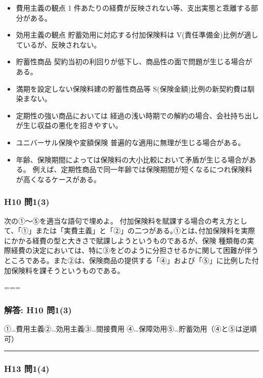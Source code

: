 \documentclass[
]{article}
\providecommand{\tightlist}{%
  \setlength{\itemsep}{0pt}\setlength{\parskip}{0pt}}
\begin{document}
\begin{itemize}
\tightlist
\item
  費用主義の観点 1
  件あたりの経費が反映されない等、支出実態と乖離する部分がある。
\item
  効用主義の観点 貯蓄効用に対応する付加保険料は
  V(責任準備金)比例が適しているが、反映されない。
\item
  貯蓄性商品
  契約当初の利回りが低下し、商品性の面で問題が生じる場合がある。
\item
  満期を設定しない保険料建の貯蓄性商品等
  S(保険金額)比例の新契約費は馴染まない。
\item
  定期性の強い商品においては
  経過の浅い時期での解約の場合、会社持ち出しが生じ収益の悪化を招きやすい。
\item
  ユニバーサル保険や変額保険 普遍的な適用に無理が生じる場合がある。
\item
  年齢、保険期間によっては保険料の大小比較において矛盾が生じる場合がある。
  例えば、定期性商品で同一年齢では保険期間が短くなるにつれ保険料が高くなるケースがある。
\end{itemize}

\hypertarget{h10-ux554f13}{%
\subsubsection{H10 問1(3)}\label{h10-ux554f13}}

次の①～⑤を適当な語句で埋めよ。
付加保険料を賦課する場合の考え方として、「①」または「実費主義」と「②」の二つがある｡①とは､付加保険料を実際にかかる経費の型と大きさで賦課しようというものであるが、保険
種類毎の実際経費の決定においては、特に③をどのように分担させるかに関して困難が伴うところである。また②は、保険商品の提供する「④」および「⑤」に比例した付加保険料を課そうというものである。

===

\hypertarget{ux89e3ux7b54-h10-ux554f13}{%
\subsubsection{解答: H10 問1(3)}\label{ux89e3ux7b54-h10-ux554f13}}

①\ldots 費用主義②\ldots 効用主義③\ldots 間接費用
④\ldots 保障効用⑤\ldots 貯蓄効用（④と⑤は逆順可）

\begin{center}\rule{0.5\linewidth}{0.5pt}\end{center}

\hypertarget{h13-ux554f14}{%
\subsubsection{H13 問1(4)}\label{h13-ux554f14}}
\end{document}
